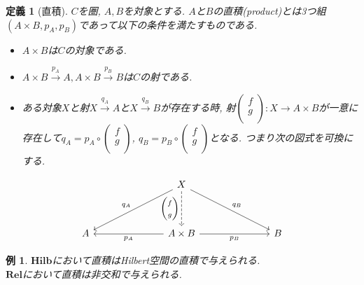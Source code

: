 \documentclass[a4paper,12pt]{ltjsarticle}
\theoremstyle{break}
\newtheorem{defn}[thm]{定義}
\newtheorem{eg}[thm]{例}
\newcommand{\rel}{\mathbf{Rel}}
\newcommand{\hilb}{\mathbf{Hilb}}
\newcommand{\xr}[1]{\xrightarrow{#1}}
\newcommand{\ci}{\circ}
\newcommand{\ti}{\times}
\numberwithin{equation}{section}
\begin{document}
\begin{defn}[直積]
  $C$を圏, $A, B$を対象とする. 
  $A$と$B$の直積(product)とは3つ組$(A \ti B, p_A, p_B)$であって以下の条件を満たすものである.
  \begin{itemize} 
    \item $A \ti B$は$C$の対象である. 
    \item $A \ti B \xr{p_A} A, A \ti B \xr{p_B} B$は$C$の射である. 
    \item ある対象$X$と射$X \xr{q_A} A$と$X \xr{q_B} B$が存在する時, 射$\begin{pmatrix} f \\ g \\ \end{pmatrix}: X \to A \ti B$が一意に存在して$q_A = p_A \ci \begin{pmatrix} f \\ g \\ \end{pmatrix}$, $q_B = p_B \ci \begin{pmatrix} f \\ g \\ \end{pmatrix}$となる. 
    つまり次の図式を可換にする. 
  \end{itemize}   
  \[\begin{tikzcd}
	  &&& X \\
	  \\
	  A &&& {A \times B} &&& B
	  \arrow["{q_B}", from=1-4, to=3-7]
	  \arrow["{q_A}"', from=1-4, to=3-1]
	  \arrow["{\begin{pmatrix} f \\ g \\ \end{pmatrix}}"', dashed, from=1-4, to=3-4]
	  \arrow["{p_A}", from=3-4, to=3-1]
	  \arrow["{p_B}"', from=3-4, to=3-7]
  \end{tikzcd}\]
\end{defn}

\begin{eg}
  $\hilb$において直積はHilbert空間の直積で与えられる. \\
  $\rel$において直積は非交和で与えられる. 
\end{eg}
\end{document}
